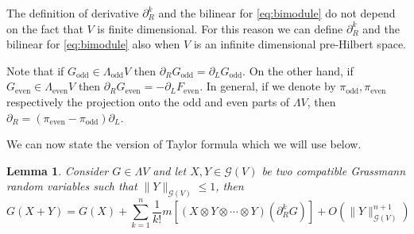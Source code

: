 \documentclass[11pt]{article}
\newcommand{\tmop}[1]{\ensuremath{\operatorname{#1}}}
\newtheorem{lemma}{Lemma}
\begin{document}
\begin{remark}
  \label{remark_infinitederivative}The definition of derivative $\partial_R^k$
  and the bilinear for {\eqref{eq:bimodule}} do not depend on the fact that
  $V$ is finite dimensional. For this reason we can define $\partial_R^k$ and
  the bilinear for {\eqref{eq:bimodule}} also when $V$ is an infinite
  dimensional pre-Hilbert space.
\end{remark}

\begin{remark}
  Note that if $G_{\tmop{odd}} \in \Lambda_{\tmop{odd}} V$ then $\partial_R
  G_{\tmop{odd}} = \partial_L G_{\tmop{odd}}$. On the other hand, if
  $G_{\tmop{even}} \in \Lambda_{\tmop{even}} V$ then $\partial_R
  G_{\tmop{even}} = - \partial_L F_{\tmop{even}}$. In general, if we denote by
  $\pi_{\tmop{odd}}, \pi_{\tmop{even}}$ respectively the projection onto the
  odd and even parts of $\Lambda V$, then $\partial_R = (\pi_{\tmop{even}} -
  \pi_{\tmop{odd}}) \partial_L$.
\end{remark}

We can now state the version of Taylor formula which we will use below.

\begin{lemma}
  \label{lemma:taylor}Consider $G \in \Lambda V$ and let $X, Y \in \mathcal{G}
  (V)$ be two compatible Grassmann random variables such that $\| Y
  \|_{\mathcal{G} (V)} \leqslant 1$, then
  \begin{equation}
    G (X + Y) = G (X) + \sum_{k = 1}^n \frac{1}{k!} m [(X \otimes Y \otimes
    \cdots \otimes Y) (\partial_R^k G)] + O (\| Y \|^{n + 1}_{\mathcal{G}
    (V)}) \label{eq:taylor}
  \end{equation}
\end{lemma}
\end{document}
